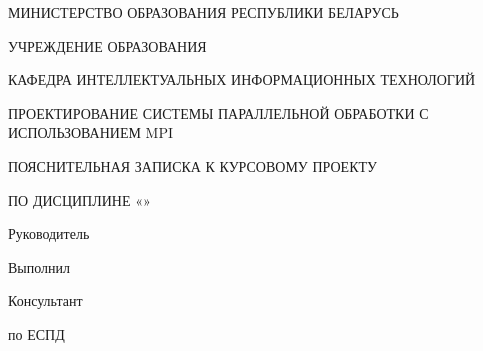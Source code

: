 \begin{center}
    МИНИСТЕРСТВО ОБРАЗОВАНИЯ РЕСПУБЛИКИ БЕЛАРУСЬ

    УЧРЕЖДЕНИЕ ОБРАЗОВАНИЯ

    КАФЕДРА ИНТЕЛЛЕКТУАЛЬНЫХ ИНФОРМАЦИОННЫХ ТЕХНОЛОГИЙ
\end{center}

\vfill

\begin{center}
    ПРОЕКТИРОВАНИЕ СИСТЕМЫ ПАРАЛЛЕЛЬНОЙ ОБРАБОТКИ С ИСПОЛЬЗОВАНИЕМ MPI
\end{center}

\vfill

\begin{center}
    ПОЯСНИТЕЛЬНАЯ ЗАПИСКА К КУРСОВОМУ ПРОЕКТУ

    ПО ДИСЦИПЛИНЕ «\titlePageSubject»
\end{center}

\vfill

\begin{center}

\end{center}

\vfill

\begin{flushright}
    \begin{minipage}[t]{7cm}
        Руководитель

        \vspace{4mm}

        Выполнил

        \vspace{4mm}

        Консультант

        по ЕСПД
    \end{minipage}
    \begin{minipage}[t]{7cm}
        \titlePageTeacherSurname~\titlePageTeacherName

        \vspace{4mm}

        \titlePageStudentSurname~\titlePageStudentName

        \vspace{4mm}

        \titlePageTeacherSurname~\titlePageTeacherName
    \end{minipage}
\end{flushright}

\vfill

\begin{center}
    \titlePageCity~\ESKDtheYear
\end{center}
